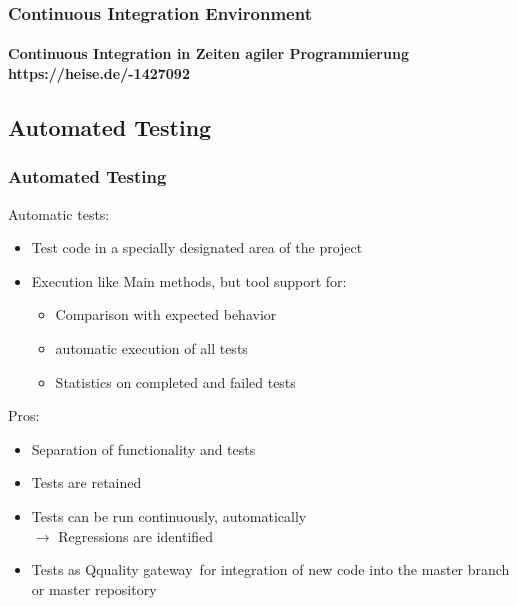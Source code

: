 
\begin{frame}
\frametitle{Continuous Integration Environment}
\framesubtitle{\tiny Continuous Integration in Zeiten agiler Programmierung https://heise.de/-1427092}
  \begin{center}
  \end{center}
\end{frame}


\subsection{Automated Testing}


\begin{frame}
 \frametitle{Automated Testing}
 
 Automatic tests:
  \begin{itemize}
  \item Test code in a specially designated area of the project
  \item Execution like \glqq Main methods\grqq, but tool support for:
  \begin{itemize}
    \item Comparison with expected behavior
    \item automatic execution of all tests
    \item Statistics on completed and failed tests
   \end{itemize}

\end{itemize}

 \pause
 
Pros:
\begin{itemize}
   \item Separation of functionality and tests
   \item Tests are retained
   \item Tests can be run continuously, automatically\\
      $\rightarrow$ Regressions are identified
   \item Tests as \glqq Qquality gateway\grqq\ for integration of new code into the master branch or master repository
\end{itemize}
\end{frame}


